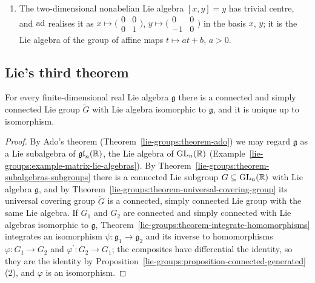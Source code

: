 \begin{example}
\begin{enumerate}
\item The two-dimensional nonabelian Lie algebra $[x, y] = y$ has trivial centre, and $\operatorname{ad}$ realises it as $x \mapsto \bigl(\begin{smallmatrix}0 & 0\\ 0 & 1\end{smallmatrix}\bigr)$,
$y \mapsto \bigl(\begin{smallmatrix}0 & 0\\ -1 & 0\end{smallmatrix}\bigr)$ in the basis $x$, $y$; it is the Lie algebra of the group of affine maps $t \mapsto at + b$, $a > 0$.
\end{enumerate}
\end{example}

\subsection{Lie's third theorem}\label{lie-groups:subsection-lie-third}

\begin{theorem}\label{lie-groups:theorem-lie-third}
For every finite-dimensional real Lie algebra $\mathfrak{g}$ there is a connected and simply connected Lie group $\widetilde{G}$ with Lie algebra isomorphic to $\mathfrak{g}$,
and it is unique up to isomorphism.
\end{theorem}

\begin{proof}
By Ado's theorem (Theorem~\ref{lie-groups:theorem-ado}) we may regard $\mathfrak{g}$ as a Lie subalgebra of $\mathfrak{gl}_n(\mathbb{R})$, the Lie algebra of $\mathrm{GL}_n(\mathbb{R})$
(Example~\ref{lie-groups:example-matrix-lie-algebras}). By Theorem~\ref{lie-groups:theorem-subalgebras-subgroups} there is a connected Lie subgroup
$G \subseteq \mathrm{GL}_n(\mathbb{R})$ with Lie algebra $\mathfrak{g}$, and by Theorem~\ref{lie-groups:theorem-universal-covering-group} its universal covering group $\widetilde{G}$ is a
connected, simply connected Lie group with the same Lie algebra. If $G_1$ and $G_2$ are connected and simply connected with Lie algebras isomorphic to $\mathfrak{g}$,
Theorem~\ref{lie-groups:theorem-integrate-homomorphisms} integrates an isomorphism $\psi \colon \mathfrak{g}_1 \to \mathfrak{g}_2$ and its inverse to homomorphisms
$\varphi \colon G_1 \to G_2$ and $\varphi^{\prime} \colon G_2 \to G_1$; the composites have differential the identity, so they are the identity by
Proposition~\ref{lie-groups:proposition-connected-generated}(2), and $\varphi$ is an isomorphism.
\end{proof}

